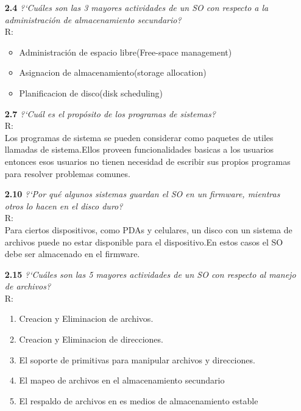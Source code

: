 \begin{itemize}
\item[\textbf{2.4}]\emph{ ?`Cu\'ales son las 3 mayores actividades de un SO con respecto a la administraci\'on de almacenamiento secundario?}\\
R:
\begin{itemize}
	\item Administraci\'on de espacio libre(Free-space management)
	\item Asignacion de almacenamiento(storage allocation)
	\item Planificacion de disco(disk scheduling)
\end{itemize}
\item[\textbf{2.7}] \emph{?`Cu\'al es el prop\'osito de los programas de sistemas?}\\
R:\\
Los programas de sistema se pueden considerar como paquetes de utiles llamadas de sistema.Ellos proveen funcionalidades basicas a los usuarios entonces esos usuarios no tienen necesidad de escribir sus propios programas para resolver problemas comunes.
\item[\textbf{2.10}]\emph{?`Por qu\'e algunos sistemas guardan el SO en un firmware, mientras otros lo hacen en el disco duro?}\\
R:\\
Para ciertos dispositivos, como PDAs y celulares, un disco con un sistema de archivos puede no estar disponible para el dispositivo.En estos casos el SO debe ser almacenado en el firmware.
\item[\textbf{2.15}]\emph{?`Cu\'ales son las 5 mayores actividades de un SO con respecto al manejo de archivos?}\\
R:
\begin{enumerate}
	\item Creacion y Eliminacion de archivos.
 	\item Creacion y Eliminacion de direcciones.
 	\item El soporte de primitivas para manipular archivos y direcciones.
 	\item El mapeo de archivos en el almacenamiento secundario
 	\item El respaldo de archivos en es medios de almacenamiento estable
\end{enumerate}


\end{itemize}
